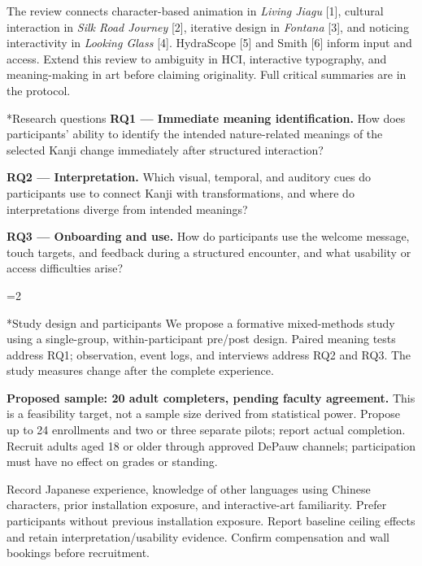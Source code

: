 \documentclass[10pt,letterpaper]{article}
\makeatletter
\renewcommand\section{\@startsection{section}{1}{0pt}{8pt}{4pt}{\normalfont\large\bfseries}}
\newcommand{\nextpage}[1]{\clearpage\ifnum\value{page}=#1\relax\else\PackageError{proposal-length}{A planned page overflowed}{Shorten the preceding page.}\fi}
\makeatother
\begin{document}
The review connects character-based animation in \emph{Living Jiagu} [1], cultural interaction in \emph{Silk Road Journey} [2], iterative design in \emph{Fontana} [3], and noticing interactivity in \emph{Looking Glass} [4]. HydraScope [5] and Smith [6] inform input and access. Extend this review to ambiguity in HCI, interactive typography, and meaning-making in art before claiming originality. Full critical summaries are in the protocol.

\section*{Research questions}
\textbf{RQ1 --- Immediate meaning identification.} How does participants' ability to identify the intended nature-related meanings of the selected Kanji change immediately after structured interaction?

\textbf{RQ2 --- Interpretation.} Which visual, temporal, and auditory cues do participants use to connect Kanji with transformations, and where do interpretations diverge from intended meanings?

\textbf{RQ3 --- Onboarding and use.} How do participants use the welcome message, touch targets, and feedback during a structured encounter, and what usability or access difficulties arise?

\nextpage{2}
\section*{Study design and participants}
We propose a formative mixed-methods study using a single-group, within-participant pre/post design. Paired meaning tests address RQ1; observation, event logs, and interviews address RQ2 and RQ3. The study measures change after the complete experience. 

\textbf{Proposed sample: 20 adult completers, pending faculty agreement.} This is a feasibility target, not a sample size derived from statistical power. Propose up to 24 enrollments and two or three separate pilots; report actual completion. Recruit adults aged 18 or older through approved DePauw channels; participation must have no effect on grades or standing.

Record Japanese experience, knowledge of other languages using Chinese characters, prior installation exposure, and interactive-art familiarity. Prefer participants without previous installation exposure. Report baseline ceiling effects and retain interpretation/usability evidence. Confirm compensation and wall bookings before recruitment.
\end{document}
